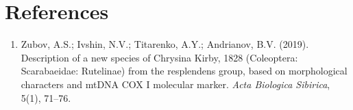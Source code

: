\section*{References}

\begin{enumerate}
  \item Zubov, A.S.; Ivshin, N.V.; Titarenko, A.Y.; Andrianov, B.V. (2019). Description of a new species of Chrysina Kirby, 1828 (Coleoptera: Scarabaeidae: Rutelinae) from the resplendens group, based on morphological characters and mtDNA COX I molecular marker. \textit{Acta Biologica Sibirica}, 5(1), 71--76.
\end{enumerate}

\vspace{1cm}

